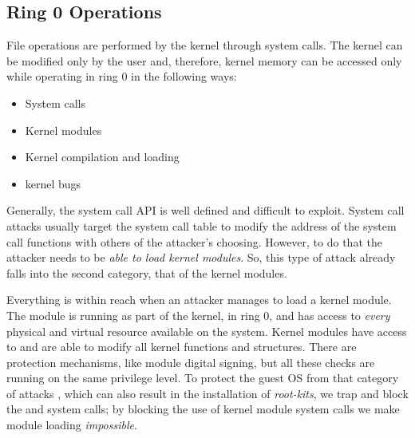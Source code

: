 \subsection{Ring 0 Operations}\label{sub:ring0}

\par File operations are performed by the kernel through system calls. The kernel can be modified only by the  user and, therefore, kernel memory can be accessed only while operating in ring 0 in the following ways:

\begin{itemize}
	\item System calls
	\item Kernel modules
	\item Kernel compilation and loading
	\item kernel bugs
\end{itemize}

\par Generally, the system call \ac{API} is well defined and difficult to exploit. System call attacks usually target the system call table to modify the address of the system call functions with others of the attacker's choosing. However, to do that the attacker needs to be \emph{able to load kernel modules}. So, this type of attack already falls into the second category, that of the kernel modules.

\par Everything is within reach when an attacker manages to load a kernel module. The module is running as part of the kernel, in ring 0, and has access to \emph{every} physical and virtual resource available on the system. Kernel modules have access to and are able to modify all kernel functions and structures. There are protection mechanisms, like module digital signing, but all these checks are running on the same privilege level. To protect the guest \ac{OS} from that category
of attacks
, which can also result in the installation of \emph{root-kits}, we trap and block the  and  system calls;
by blocking the use of kernel module system calls we make module loading \emph{impossible}.

